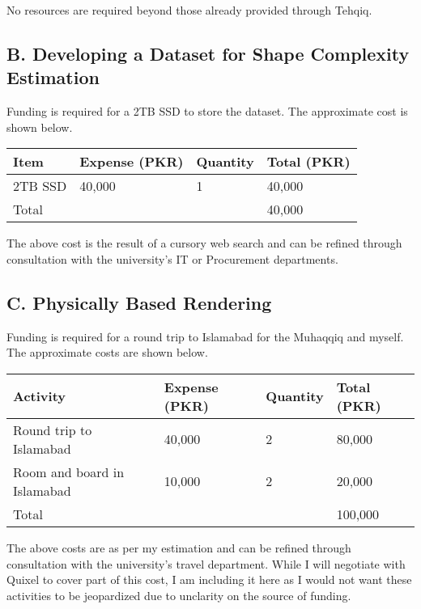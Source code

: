\documentclass{article}
\begin{document}
No resources are required beyond those already provided through Tehqiq.

\subsection*{B. Developing a Dataset for Shape Complexity Estimation}


Funding is required for a 2TB SSD to store the dataset. The approximate cost is shown below.

\begin{tabular}{|*{4}{l|}}
  \hline
  Item    & Expense (PKR) & Quantity & Total (PKR) \\\hline\hline
  2TB SSD & 40,000        & 1        & 40,000      \\\hline\hline
  Total   &               &          & 40,000      \\\hline
\end{tabular}

The above cost is the result of a cursory web search and can be refined through consultation with the university's IT or Procurement departments.

\subsection*{C. Physically Based Rendering}

Funding is required for a round trip to Islamabad for the Muhaqqiq and myself. The approximate costs are shown below.

\begin{tabular}{|*{4}{l|}}
  \hline
  Activity                    & Expense (PKR) & Quantity & Total (PKR) \\\hline\hline
  Round trip to Islamabad     & 40,000        & 2        & 80,000      \\\hline
  Room and board in Islamabad & 10,000        & 2        & 20,000      \\\hline\hline
  Total                       &               &          & 100,000     \\\hline
\end{tabular}

The above costs are as per my estimation and can be refined through consultation with the university's travel department. While I will negotiate with Quixel to cover part of this cost, I am including it here as I would not want these activities to be jeopardized due to unclarity on the source of funding.
\end{document}
